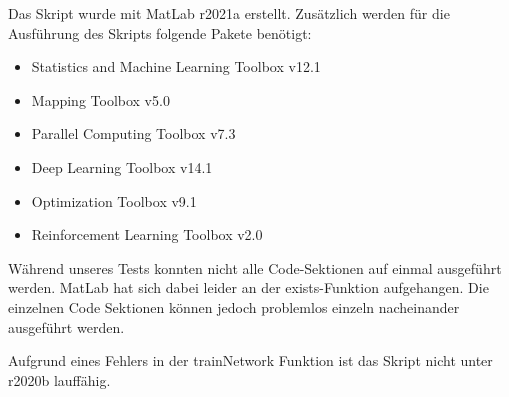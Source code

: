 \begin{titlepage}
{\begin{minipage}{0.6\textwidth}
      Das Skript wurde mit MatLab r2021a erstellt. Zusätzlich werden für die Ausführung des Skripts folgende Pakete benötigt:
      \begin{itemize}
        \item Statistics and Machine Learning Toolbox v12.1
        \item Mapping Toolbox v5.0
        \item Parallel Computing Toolbox v7.3
        \item Deep Learning Toolbox v14.1
        \item Optimization Toolbox v9.1
        \item Reinforcement Learning Toolbox v2.0
      \end{itemize}
      Während unseres Tests konnten nicht alle Code-Sektionen auf einmal ausgeführt werden. MatLab hat sich dabei leider an der exists-Funktion aufgehangen. Die einzelnen Code Sektionen können jedoch problemlos einzeln nacheinander ausgeführt werden.
      
      Aufgrund eines Fehlers in der trainNetwork Funktion ist das Skript nicht unter r2020b lauffähig.
  \end{minipage}
  }

  \end{titlepage}
 
  \newpage
  \tableofcontents